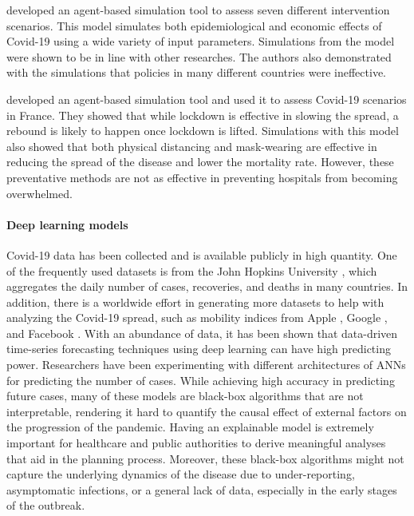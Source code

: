 \citeauthor{silvaCOVIDABSAgentbasedModel2020} \cite{silvaCOVIDABSAgentbasedModel2020} developed an agent-based simulation tool to assess seven different intervention scenarios.
This model simulates both epidemiological and economic effects of Covid-19 using a wide variety of input parameters.
Simulations from the model were shown to be in line with other researches.
The authors also demonstrated with the simulations that policies in many different countries were ineffective.

\citeauthor{hoertelStochasticAgentbasedModel2020} \cite{hoertelStochasticAgentbasedModel2020} developed an agent-based simulation tool and used it to assess Covid-19 scenarios in France.
They showed that while lockdown is effective in slowing the spread, a rebound is likely to happen once lockdown is lifted.
Simulations with this model also showed that both physical distancing and mask-wearing are effective in reducing the spread of the disease and lower the mortality rate.
However, these preventative methods are not as effective in preventing hospitals from becoming overwhelmed.

\paragraph{Deep learning models}
Covid-19 data has been collected and is available publicly in high quantity.
One of the frequently used datasets is from the John Hopkins University \cite{dongInteractiveWebbasedDashboard2020}, which aggregates the daily number of cases, recoveries, and deaths in many countries.
In addition, there is a worldwide effort in generating more datasets to help with analyzing the Covid-19 spread, such as mobility indices from Apple \cite{COVID19Mobility}, Google \cite{COVID19Mobility}, and Facebook \cite{DataGoodTools}.
With an abundance of data, it has been shown that data-driven time-series forecasting techniques using deep learning can have high predicting power.
Researchers have been experimenting with different architectures of \glspl{ANN} for predicting the number of cases.
While achieving high accuracy in predicting future cases, many of these models are black-box algorithms that are not interpretable, rendering it hard to quantify the causal effect of external factors on the progression of the pandemic.
Having an explainable model is extremely important for healthcare and public authorities to derive meaningful analyses that aid in the planning process.
Moreover, these black-box algorithms might not capture the underlying dynamics of the disease due to under-reporting, asymptomatic infections, or a general lack of data, especially in the early stages of the outbreak.

